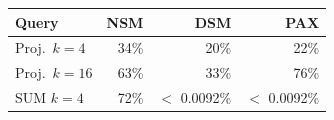 \begin{tabular}{lrrr}
\toprule
Query & NSM & DSM & PAX \\
\midrule
Proj.\ $k{=}4$ & 34\% & 20\% & 22\% \\
Proj.\ $k{=}16$ & 63\% & 33\% & 76\% \\
SUM $k{=}4$ & 72\% & $<$ 0.0092\% & $<$ 0.0092\% \\
\bottomrule
\end{tabular}
